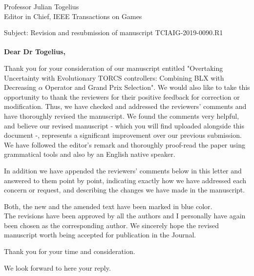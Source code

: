 \documentclass[10pt]{letter} %
\begin{document}

\begin{letter}{Professor Julian Togelius \\ Editor in Chief, IEEE Transactions on Games} %

\opening{Subject: Revision and resubmission of manuscript TCIAIG-2019-0090.R1\\
	\\	
\textbf{Dear Dr Togelius,}}

Thank you for your consideration of our manuscript entitled "Overtaking Uncertainty with Evolutionary TORCS controllers: Combining BLX with Decreasing $\alpha$ Operator and Grand Prix Selection". 
We would also like to take this opportunity to thank the reviewers for their positive feedback for correction or modification. Thus, we have checked and addressed the reviewers' comments and have thoroughly revised the manuscript. We found the comments very helpful, and believe our revised manuscript - which you will find uploaded alongside this document -, represents a significant improvement over our previous submission. \\

We have followed the editor's remark and thoroughly proof-read the paper using grammatical tools and also by an English native speaker.

In addition we have appended the reviewers' comments below in this letter and answered to them point by point, indicating exactly how we have addressed each concern or request, and describing the changes we have made in the manuscript.

Both, the new and the amended text have been marked in blue color.\\
The revisions have been approved by all the authors and I personally have again been chosen as the corresponding author. 
We sincerely hope the revised manuscript worth being accepted for publication in the Journal.

Thank you for your time and consideration.

We look forward to here your reply.


\end{letter}
\end{document}
